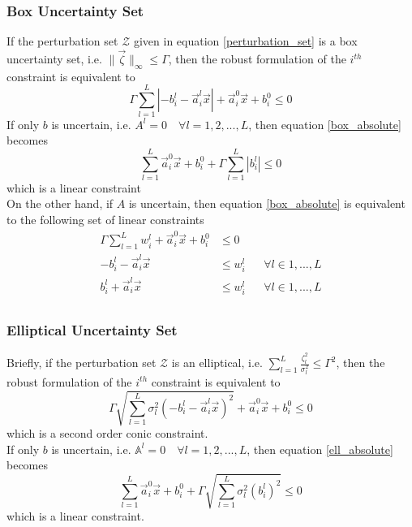 \subsubsection{Box Uncertainty Set}
If the perturbation set $\mathcal{Z}$ given in equation \eqref{perturbation_set} is a box
uncertainty set, i.e. $\|\vec{\zeta}\|_{\infty} \leq \Gamma$, then the robust formulation of the $i^{th}$ constraint is equivalent to
\begin{equation}
\Gamma \textstyle{\sum}_{l=1}^L |- {b}^l_{i} - \vec{a}^l_i\vec{x}| + \vec{a}^0_i\vec{x} + b^0_i \leq 0
\label{box_absolute}
\end{equation}
If only $b$ is uncertain, i.e. $A^l = 0 \quad \forall l = 1,2,...,L$, then equation \eqref{box_absolute} becomes
\begin{equation}
\textstyle{\sum}_{l=1}^L \vec{a}^0_{i}\vec{x} + b^0_{i} + \Gamma \textstyle{\sum}_{l=1}^L |b^l_{i}| \leq 0
\label{box_coeff}
\end{equation}
which is a linear constraint\\
On the other hand, if $A$ is uncertain, then equation \eqref{box_absolute} is equivalent to the following set of linear constraints
\begin{equation}
\begin{aligned}
\Gamma \textstyle{\sum}_{l=1}^L w^l_{i} + \vec{a}^0_{i}\vec{x} + b^0_{i} &\leq 0\\
- b^l_{i} - \vec{a}^l_{i}\vec{x} &\leq w^l_{i} &&\forall l \in 1,...,L\\
b^l_{i} + \vec{a}^l_{i}\vec{x} &\leq w^l_{i} &&\forall l \in 1,...,L\\
\end{aligned}
\label{box_linear}
\end{equation}

\subsubsection{Elliptical Uncertainty Set}
Briefly, if the perturbation set $\mathcal{Z}$ is an elliptical, i.e. $\textstyle{\sum}_{l=1}^L\frac{\zeta_l^2}{\sigma_l^2} \leq \Gamma^2$,
then the robust formulation of the $i^{th}$ constraint is equivalent to
\begin{equation}
\Gamma \sqrt{\textstyle{\sum}_{l=1}^L \sigma_l^2(- b^l_{i} - \vec{a}^l_{i}\vec{x})^2} + \vec{a}^0_{i}\vec{x} + b^0_{i} \leq 0
\label{ell_absolute}
\end{equation}
which is a second order conic constraint.\\
If only $b$ is uncertain, i.e. $\mathbb{A}^l = 0 \quad \forall l = 1,2,...,L$, then equation \eqref{ell_absolute} becomes
\begin{equation}
\textstyle{\sum}_{l=1}^L \vec{a}^0_{i}\vec{x} + b^0_{i} + \Gamma \sqrt{\textstyle{\sum}_{l=1}^L \sigma_l^2(b^l_{i})^2} \leq 0
\label{ell_coeff}
\end{equation}
which is a linear constraint.
